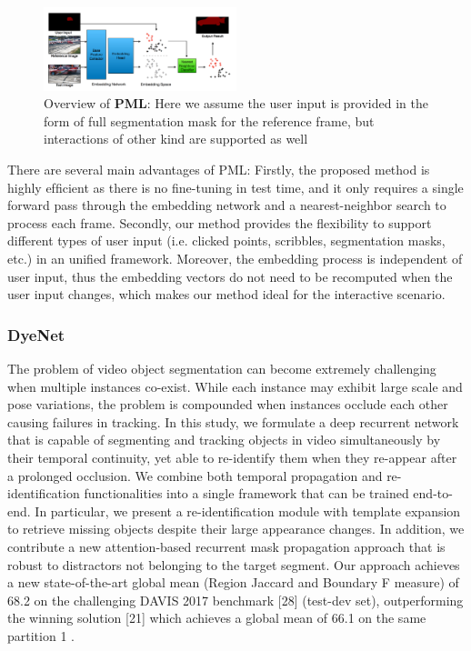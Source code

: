 \begin{figure}[ht]
    \centering
    \includegraphics[width=0.5\textwidth]{./figure/PML.png}
    \caption{Overview of \textbf{PML}: Here we assume the user input is provided in the form of full segmentation mask for the reference frame, but interactions of other kind are supported as well}
    \label{PML}
\end{figure}

There are several main advantages of PML: Firstly, the proposed method is highly efﬁcient as there is no ﬁne-tuning in test time, and it only requires a single forward pass through the embedding network and a nearest-neighbor search to process each frame. Secondly, our method provides the ﬂexibility to support different types of user input (i.e. clicked points, scribbles, segmentation masks, etc.) in an uniﬁed framework. Moreover, the embedding process is independent of user input, thus the embedding vectors do not need to be recomputed when the user input changes, which makes our method ideal for the interactive scenario.


\subsubsection{DyeNet}
The problem of video object segmentation can become extremely challenging when multiple instances co-exist. While each instance may exhibit large scale and pose variations, the problem is compounded when instances occlude each other causing failures in tracking. In this study, we formulate a deep recurrent network that is capable of segmenting and tracking objects in video simultaneously by their temporal continuity, yet able to re-identify them when they re-appear after a prolonged occlusion. We combine both temporal propagation and re-identiﬁcation functionalities into a single framework that can be trained end-to-end. In particular, we present a re-identiﬁcation module with template expansion to retrieve missing objects despite their large appearance changes. In addition, we contribute a new attention-based recurrent mask propagation approach that is robust to distractors not belonging to the target segment. Our approach achieves a new state-of-the-art global mean (Region Jaccard and Boundary F measure) of 68.2 on the challenging DAVIS 2017 benchmark [28] (test-dev set), outperforming the winning solution [21] which achieves a global mean of 66.1 on the same partition 1 .

